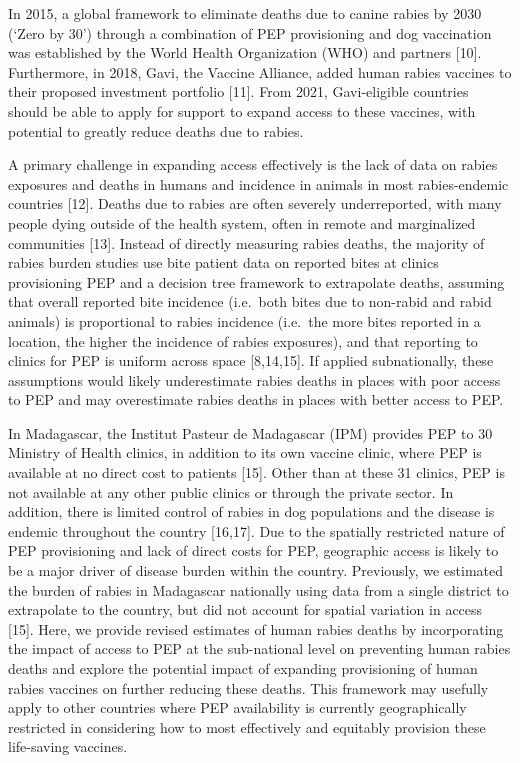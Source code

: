 \documentclass[
  oneside]{book}
\begin{document}
In 2015, a global framework to eliminate deaths due to canine rabies by
2030 (`Zero by 30') through a combination of PEP provisioning and dog
vaccination was established by the World Health Organization (WHO) and
partners {[}10{]}. Furthermore, in 2018, Gavi, the Vaccine Alliance, added
human rabies vaccines to their proposed investment portfolio {[}11{]}.
From 2021, Gavi-eligible countries should be able to apply for support
to expand access to these vaccines, with potential to greatly reduce
deaths due to rabies.

A primary challenge in expanding access effectively is the lack of data
on rabies exposures and deaths in humans and incidence in animals in
most rabies-endemic countries {[}12{]}. Deaths due to rabies are often
severely underreported, with many people dying outside of the health
system, often in remote and marginalized communities {[}13{]}. Instead of
directly measuring rabies deaths, the majority of rabies burden studies
use bite patient data on reported bites at clinics provisioning PEP and
a decision tree framework to extrapolate deaths, assuming that overall
reported bite incidence (i.e.~both bites due to non-rabid and rabid
animals) is proportional to rabies incidence (i.e.~the more bites
reported in a location, the higher the incidence of rabies exposures),
and that reporting to clinics for PEP is uniform across space
{[}8,14,15{]}. If applied subnationally, these assumptions would likely
underestimate rabies deaths in places with poor access to PEP and may
overestimate rabies deaths in places with better access to PEP.

In Madagascar, the Institut Pasteur de Madagascar (IPM) provides PEP to
30 Ministry of Health clinics, in addition to its own vaccine clinic,
where PEP is available at no direct cost to patients {[}15{]}. Other than
at these 31 clinics, PEP is not available at any other public clinics or
through the private sector. In addition, there is limited control of
rabies in dog populations and the disease is endemic throughout the
country {[}16,17{]}. Due to the spatially restricted nature of PEP
provisioning and lack of direct costs for PEP, geographic access is
likely to be a major driver of disease burden within the country.
Previously, we estimated the burden of rabies in Madagascar nationally
using data from a single district to extrapolate to the country, but did
not account for spatial variation in access {[}15{]}. Here, we provide
revised estimates of human rabies deaths by incorporating the impact of
access to PEP at the sub-national level on preventing human rabies
deaths and explore the potential impact of expanding provisioning of
human rabies vaccines on further reducing these deaths. This framework
may usefully apply to other countries where PEP availability is
currently geographically restricted in considering how to most
effectively and equitably provision these life-saving vaccines.
\end{document}
